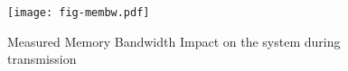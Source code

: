 \begin{figure}[t]
\texttt{[image: fig-membw.pdf]}
\caption{Measured Memory Bandwidth Impact on the system during transmission}
\label{fig:membw}
\end{figure}
